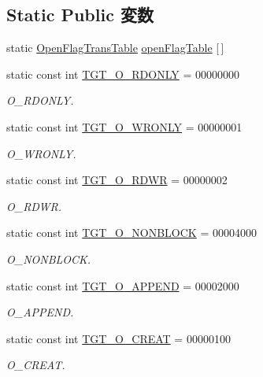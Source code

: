 \subsection*{Static Public 変数}
\begin{DoxyCompactItemize}
\item 
static \hyperlink{structOpenFlagTransTable}{OpenFlagTransTable} \hyperlink{classX86Linux64_ab1db5a531609b99b262cc849ea24765a}{openFlagTable} \mbox{[}$\,$\mbox{]}
\item 
static const int \hyperlink{classX86Linux64_ad266b23a0ae07d1833e18bae651f3411}{TGT\_\-O\_\-RDONLY} = 00000000
\begin{DoxyCompactList}\small\item\em O\_\-RDONLY. \item\end{DoxyCompactList}\item 
static const int \hyperlink{classX86Linux64_a6156c069cefe05ce3cce033b2e0c2de2}{TGT\_\-O\_\-WRONLY} = 00000001
\begin{DoxyCompactList}\small\item\em O\_\-WRONLY. \item\end{DoxyCompactList}\item 
static const int \hyperlink{classX86Linux64_ac6fa9ecf5d2f3314f197698f1099e2ac}{TGT\_\-O\_\-RDWR} = 00000002
\begin{DoxyCompactList}\small\item\em O\_\-RDWR. \item\end{DoxyCompactList}\item 
static const int \hyperlink{classX86Linux64_a0ea5420b4c9b45ba342a266fb77ac942}{TGT\_\-O\_\-NONBLOCK} = 00004000
\begin{DoxyCompactList}\small\item\em O\_\-NONBLOCK. \item\end{DoxyCompactList}\item 
static const int \hyperlink{classX86Linux64_af11adc5404ea3780a5ce2829cc3710b7}{TGT\_\-O\_\-APPEND} = 00002000
\begin{DoxyCompactList}\small\item\em O\_\-APPEND. \item\end{DoxyCompactList}\item 
static const int \hyperlink{classX86Linux64_aec02e04ca367e6c3f4b46e4edc12efac}{TGT\_\-O\_\-CREAT} = 00000100
\begin{DoxyCompactList}\small\item\em O\_\-CREAT. \item\end{DoxyCompactList}\item 

\end{DoxyCompactItemize}
